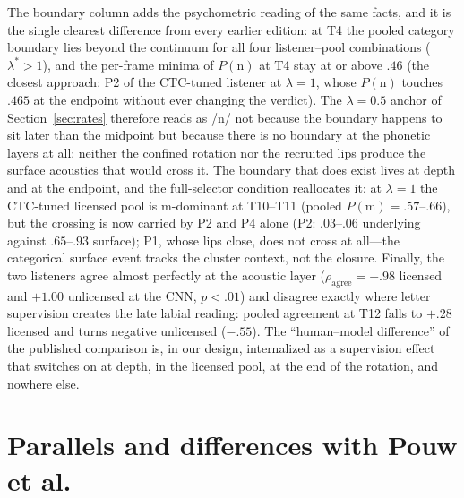 \documentclass[11pt,a4paper]{article}
\newcommand{\lam}{\lambda}
\begin{document}
The boundary column adds the psychometric reading of the same
facts, and it is the single clearest difference from every earlier
edition: at T4 the pooled category boundary lies beyond the
continuum for all four listener--pool combinations ($\lam^{*} > 1$),
and the per-frame minima of $P(\mathrm{n})$ at T4 stay at or above
$.46$ (the closest approach: P2 of the CTC-tuned listener at
$\lam=1$, whose $P(\mathrm{n})$ touches $.465$ at the endpoint
without ever changing the verdict).
The $\lam=0.5$ anchor of Section~\ref{sec:rates} therefore reads as
/n/ not because the boundary happens to sit later than the midpoint
but because there is no boundary at the phonetic layers at all:
neither the confined rotation nor the recruited lips produce the
surface acoustics that would cross it. The boundary that does exist
lives at depth and at the endpoint, and the full-selector condition
reallocates it: at $\lam=1$ the CTC-tuned licensed pool is
$\mathrm{m}$-dominant at T10--T11 (pooled $P(\mathrm{m}) =
.57$--$.66$), but the crossing is now carried by P2 and P4 alone
(P2: $.03$--$.06$ underlying against $.65$--$.93$ surface); P1,
whose lips close, does not cross at all---the categorical surface
event tracks the cluster context, not the closure. Finally, the two listeners agree almost perfectly at the
acoustic layer ($\rho_{\mathrm{agree}} = +.98$ licensed and
$+1.00$ unlicensed at the CNN, $p < .01$) and disagree exactly where
letter supervision creates the late labial reading: pooled agreement
at T12 falls to $+.28$ licensed and turns negative unlicensed
($-.55$). The
``human--model difference'' of the published comparison is, in our
design, internalized as a supervision effect that switches on at
depth, in the licensed pool, at the end of the rotation, and nowhere
else.

\section{Parallels and differences with Pouw et al.}
\label{sec:paralles}
\end{document}
